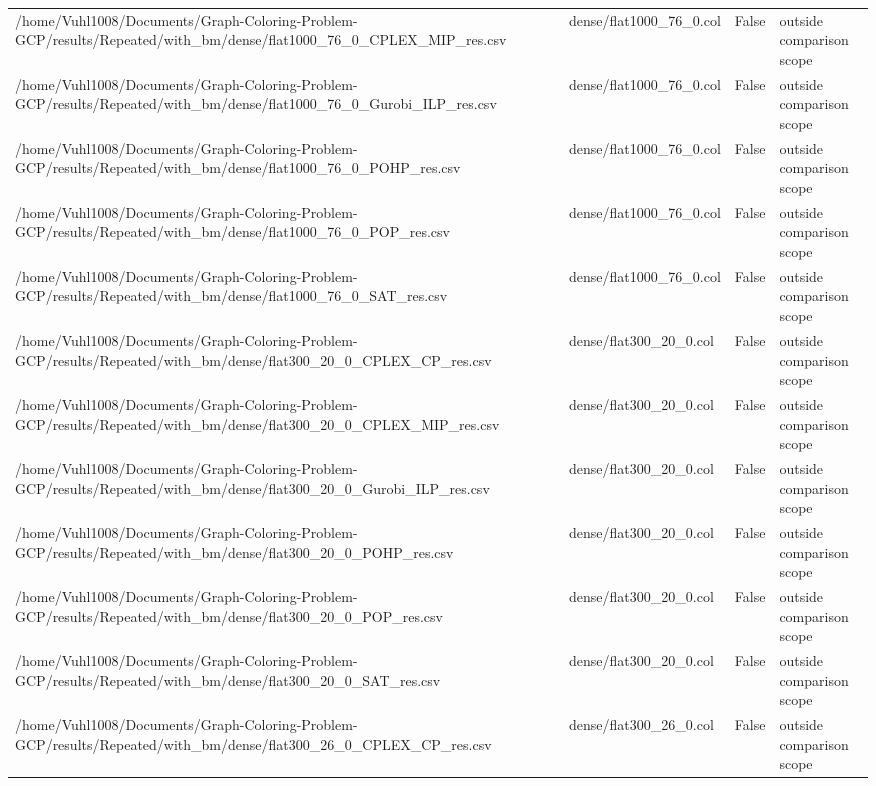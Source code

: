 \begin{table}[htbp]
\begin{tabular}{llll}
/home/Vuhl1008/Documents/Graph-Coloring-Problem-GCP/results/Repeated/with\_bm/dense/flat1000\_76\_0\_CPLEX\_MIP\_res.csv & dense/flat1000\_76\_0.col & False & outside comparison scope \\
/home/Vuhl1008/Documents/Graph-Coloring-Problem-GCP/results/Repeated/with\_bm/dense/flat1000\_76\_0\_Gurobi\_ILP\_res.csv & dense/flat1000\_76\_0.col & False & outside comparison scope \\
/home/Vuhl1008/Documents/Graph-Coloring-Problem-GCP/results/Repeated/with\_bm/dense/flat1000\_76\_0\_POHP\_res.csv & dense/flat1000\_76\_0.col & False & outside comparison scope \\
/home/Vuhl1008/Documents/Graph-Coloring-Problem-GCP/results/Repeated/with\_bm/dense/flat1000\_76\_0\_POP\_res.csv & dense/flat1000\_76\_0.col & False & outside comparison scope \\
/home/Vuhl1008/Documents/Graph-Coloring-Problem-GCP/results/Repeated/with\_bm/dense/flat1000\_76\_0\_SAT\_res.csv & dense/flat1000\_76\_0.col & False & outside comparison scope \\
/home/Vuhl1008/Documents/Graph-Coloring-Problem-GCP/results/Repeated/with\_bm/dense/flat300\_20\_0\_CPLEX\_CP\_res.csv & dense/flat300\_20\_0.col & False & outside comparison scope \\
/home/Vuhl1008/Documents/Graph-Coloring-Problem-GCP/results/Repeated/with\_bm/dense/flat300\_20\_0\_CPLEX\_MIP\_res.csv & dense/flat300\_20\_0.col & False & outside comparison scope \\
/home/Vuhl1008/Documents/Graph-Coloring-Problem-GCP/results/Repeated/with\_bm/dense/flat300\_20\_0\_Gurobi\_ILP\_res.csv & dense/flat300\_20\_0.col & False & outside comparison scope \\
/home/Vuhl1008/Documents/Graph-Coloring-Problem-GCP/results/Repeated/with\_bm/dense/flat300\_20\_0\_POHP\_res.csv & dense/flat300\_20\_0.col & False & outside comparison scope \\
/home/Vuhl1008/Documents/Graph-Coloring-Problem-GCP/results/Repeated/with\_bm/dense/flat300\_20\_0\_POP\_res.csv & dense/flat300\_20\_0.col & False & outside comparison scope \\
/home/Vuhl1008/Documents/Graph-Coloring-Problem-GCP/results/Repeated/with\_bm/dense/flat300\_20\_0\_SAT\_res.csv & dense/flat300\_20\_0.col & False & outside comparison scope \\
/home/Vuhl1008/Documents/Graph-Coloring-Problem-GCP/results/Repeated/with\_bm/dense/flat300\_26\_0\_CPLEX\_CP\_res.csv & dense/flat300\_26\_0.col & False & outside comparison scope \\

\end{tabular}
\end{table}
